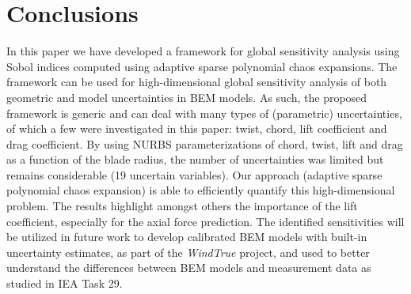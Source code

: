 
\section{Conclusions}\label{sec:conclusions}
In this paper we have developed a framework for global sensitivity analysis using Sobol indices computed using adaptive sparse polynomial chaos expansions. The framework can be used for high-dimensional global sensitivity analysis of both geometric and model uncertainties in BEM models. As such, the proposed framework is generic and can deal with many types of (parametric) uncertainties, of which a few were investigated in this paper: twist, chord, lift coefficient and drag coefficient. By using NURBS parameterizations of chord, twist, lift and drag as a function of the blade radius, the number of uncertainties was limited but remains considerable (19 uncertain variables). Our approach (adaptive sparse polynomial chaos expansion) is able to efficiently quantify this high-dimensional problem. The results highlight amongst others the importance of the lift coefficient, especially for the axial force prediction. The identified sensitivities will be utilized in future work to develop calibrated BEM models with built-in uncertainty estimates, as part of the \textit{WindTrue} project, and used to better understand the differences between BEM models and measurement data as studied in IEA Task 29. 
